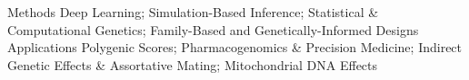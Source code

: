 

\begin{interests}

  \interest
    {Methods} %
    {Deep Learning; Simulation-Based Inference; Statistical \& Computational Genetics; Family-Based and Genetically-Informed Designs}
  \interest
    {Applications} %
    {Polygenic Scores; Pharmacogenomics \& Precision Medicine; Indirect Genetic Effects \& Assortative Mating; Mitochondrial DNA Effects}

\end{interests}
